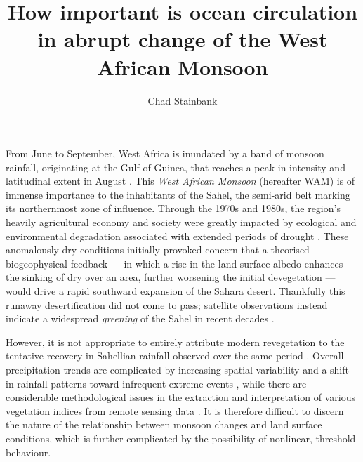 \documentclass[a4paper]{article}
\begin{document}
\title{How important is ocean circulation in abrupt change of the West African Monsoon}
\author{Chad Stainbank}
\maketitle

From June to September, West Africa is inundated by a band of monsoon rainfall, originating at the Gulf of Guinea, that reaches a peak in intensity and latitudinal extent in August \parencite{sultan2003west}.
This \emph{West African Monsoon} (hereafter WAM) is of immense importance to the inhabitants of the Sahel, the semi-arid belt marking its northernmost zone of influence.
Through the 1970s and 1980s, the region's heavily agricultural economy and society were greatly impacted by ecological and environmental degradation associated with extended periods of drought \parencite{benson1998impact, olsson1993causes, walther2016review}.
These anomalously dry conditions initially provoked concern that a theorised biogeophysical feedback --- in which a rise in the land surface albedo enhances the sinking of dry over an area, further worsening the initial devegetation \parencite{charney1975dynamics, charney1975drought} --- would drive a rapid southward expansion of the Sahara desert.
Thankfully this runaway desertification did not come to pass; satellite observations instead indicate a widespread \emph{greening} of the Sahel in recent decades \parencite{olsson2005recent, dardel2014re}.

However, it is not appropriate to entirely attribute modern revegetation to the tentative recovery in Sahellian rainfall observed over the same period \parencite{lebel2009recent}.
Overall precipitation trends are complicated by increasing spatial variability and a shift in rainfall patterns toward infrequent extreme events \parencite{nicholson2013west, panthou2014recent}, while there are considerable methodological issues in the extraction and interpretation of various vegetation indices from remote sensing data \parencite{fensholt2013assessing, dardel2014rain}.
It is therefore difficult to discern the nature of the relationship between monsoon changes and land surface conditions, which is further complicated by the possibility of nonlinear, threshold behaviour. 



\printbibliography{}
\end{document}
